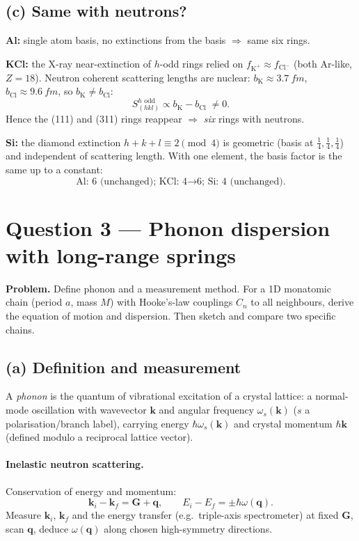 \documentclass[11pt]{article}
\begin{document}
\subsection*{(c) Same with neutrons?}

\textbf{Al:} single atom basis, no extinctions from the basis $\Rightarrow$ same six rings.

\textbf{KCl:} the X-ray near-extinction of $h$-odd rings relied on $f_{\mathrm K^{+}}\approx f_{\mathrm{Cl}^{-}}$ (both Ar-like, $Z=18$). Neutron coherent scattering lengths are nuclear: $b_{\mathrm K}\approx\SI{3.7}{fm}$, $b_{\mathrm{Cl}}\approx\SI{9.6}{fm}$, so $b_{\mathrm K}\neq b_{\mathrm{Cl}}$:
\[
S_{(hkl)}^{h\text{ odd}} \propto b_{\mathrm K}-b_{\mathrm{Cl}}\;\neq 0.
\]
Hence the (111) and (311) rings reappear $\Rightarrow$ \emph{six} rings with neutrons.

\textbf{Si:} the diamond extinction $h+k+l\equiv 2\pmod 4$ is geometric (basis at $\frac14,\frac14,\frac14$) and independent of scattering length. With one element, the basis factor is the same up to a constant:
\[
\boxed{\;\text{Al: 6 (unchanged); KCl: 4}\to\text{6; Si: 4 (unchanged).}\;}
\]

\section*{Question 3 --- Phonon dispersion with long-range springs}

\textbf{Problem.} Define phonon and a measurement method. For a 1D monatomic chain (period $a$, mass $M$) with Hooke's-law couplings $C_{n}$ to all neighbours, derive the equation of motion and dispersion. Then sketch and compare two specific chains.

\subsection*{(a) Definition and measurement}

A \emph{phonon} is the quantum of vibrational excitation of a crystal lattice: a normal-mode oscillation with wavevector $\mathbf k$ and angular frequency $\omega_{s}(\mathbf k)$ ($s$ a polarisation/branch label), carrying energy $\hbar\omega_{s}(\mathbf k)$ and crystal momentum $\hbar\mathbf k$ (defined modulo a reciprocal lattice vector).

\paragraph{Inelastic neutron scattering.} Conservation of energy and momentum:
\[
\mathbf k_{i}-\mathbf k_{f} = \mathbf G + \mathbf q,\qquad E_{i}-E_{f} = \pm\hbar\omega(\mathbf q).
\]
Measure $\mathbf k_{i}$, $\mathbf k_{f}$ and the energy transfer (e.g.\ triple-axis spectrometer) at fixed $\mathbf G$, scan $\mathbf q$, deduce $\omega(\mathbf q)$ along chosen high-symmetry directions.
\end{document}
